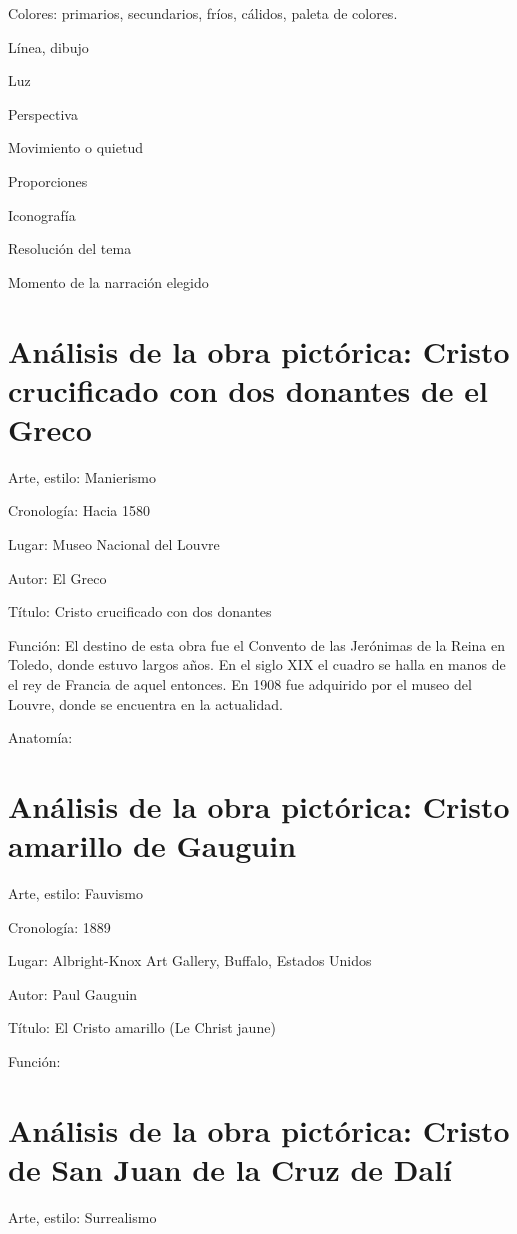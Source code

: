 \documentclass[a4paper,12pt]{article} %
\begin{document}
Colores: primarios, secundarios, fríos, cálidos, paleta de colores.

Línea, dibujo

Luz

Perspectiva

Movimiento o quietud

Proporciones

Iconografía

Resolución del tema

Momento de la narración elegido

\section{Análisis de la obra pictórica: Cristo crucificado con dos donantes de el Greco}

Arte, estilo: Manierismo

Cronología: Hacia 1580

Lugar: Museo Nacional del Louvre

Autor: El Greco

Título: Cristo crucificado con dos donantes

Función: El destino de esta obra fue el Convento de las Jerónimas de la Reina en Toledo, donde estuvo largos años. En el siglo XIX el cuadro se halla en manos de el rey de Francia de aquel entonces. En 1908 fue adquirido por el museo del Louvre, donde se encuentra en la actualidad. %

Anatomía:

\section{Análisis de la obra pictórica: Cristo amarillo de Gauguin}

Arte, estilo: Fauvismo

Cronología: 1889

Lugar: Albright-Knox Art Gallery, Buffalo, Estados Unidos

Autor: Paul Gauguin

Título: El Cristo amarillo (Le Christ jaune)

Función: 

\section{Análisis de la obra pictórica: Cristo de San Juan de la Cruz de Dalí}

Arte, estilo: Surrealismo
\end{document}
